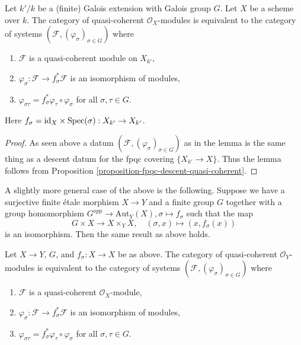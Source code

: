 \begin{lemma}
\label{lemma-galois-descent}
Let $k'/k$ be a (finite) Galois extension with Galois group $G$.
Let $X$ be a scheme over $k$. The category of quasi-coherent
$\mathcal{O}_X$-modules is equivalent to the category of systems
$(\mathcal{F}, (\varphi_\sigma)_{\sigma \in G})$ where
\begin{enumerate}
\item $\mathcal{F}$ is a quasi-coherent module on $X_{k'}$,
\item $\varphi_\sigma : \mathcal{F} \to f_\sigma^*\mathcal{F}$
is an isomorphism of modules,
\item $\varphi_{\sigma\tau} = f_\sigma^*\varphi_\tau \circ \varphi_\sigma$
for all $\sigma, \tau \in G$.
\end{enumerate}
Here $f_\sigma = \text{id}_X \times \mathop{\mathrm{Spec}}(\sigma) : X_{k'} \to X_{k'}$.
\end{lemma}

\begin{proof}
As seen above a datum $(\mathcal{F}, (\varphi_\sigma)_{\sigma \in G})$
as in the lemma is the same thing as a descent datum for the
fpqc covering $\{X_{k'} \to X\}$. Thus the lemma follows from
Proposition \ref{proposition-fpqc-descent-quasi-coherent}.
\end{proof}

\noindent
A slightly more general case of the above is the following.
Suppose we have a surjective finite \'etale morphism $X \to Y$
and a finite group $G$ together with a group homomorphism
$G^{opp} \to \text{Aut}_Y(X), \sigma \mapsto f_\sigma$
such that the map
$$
G \times X \longrightarrow X \times_Y X,\quad
(\sigma, x) \longmapsto (x, f_\sigma(x))
$$
is an isomorphism. Then the same result as above holds.

\begin{lemma}
\label{lemma-galois-descent-more-general}
Let $X \to Y$, $G$, and $f_\sigma : X \to X$ be as above.
The category of quasi-coherent
$\mathcal{O}_Y$-modules is equivalent to the category of systems
$(\mathcal{F}, (\varphi_\sigma)_{\sigma \in G})$ where
\begin{enumerate}
\item $\mathcal{F}$ is a quasi-coherent $\mathcal{O}_X$-module,
\item $\varphi_\sigma : \mathcal{F} \to f_\sigma^*\mathcal{F}$
is an isomorphism of modules,
\item $\varphi_{\sigma\tau} = f_\sigma^*\varphi_\tau \circ \varphi_\sigma$
for all $\sigma, \tau \in G$.
\end{enumerate}
\end{lemma}

